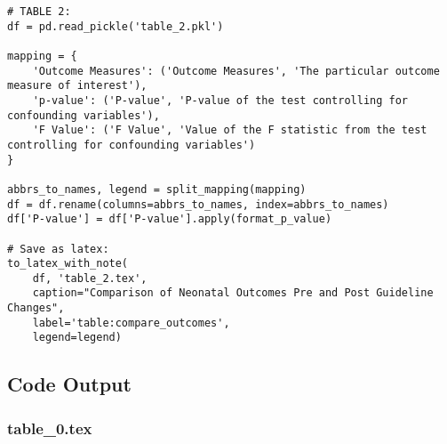\documentclass[11pt]{article}
\begin{document}
\begin{verbatim}
# TABLE 2:
df = pd.read_pickle('table_2.pkl')

mapping = {
    'Outcome Measures': ('Outcome Measures', 'The particular outcome measure of interest'),
    'p-value': ('P-value', 'P-value of the test controlling for confounding variables'),
    'F Value': ('F Value', 'Value of the F statistic from the test controlling for confounding variables')
}

abbrs_to_names, legend = split_mapping(mapping)
df = df.rename(columns=abbrs_to_names, index=abbrs_to_names)
df['P-value'] = df['P-value'].apply(format_p_value)

# Save as latex:
to_latex_with_note(
    df, 'table_2.tex',
    caption="Comparison of Neonatal Outcomes Pre and Post Guideline Changes",
    label='table:compare_outcomes',
    legend=legend)

\end{verbatim}



\subsection{Code Output}

\subsubsection*{table\_0.tex}
\end{document}
